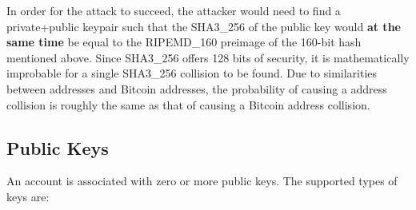 In order for the attack to succeed, the attacker would need to find a private+public keypair such that the SHA3\_256 of the public key would \textbf{at the same time} be equal to the RIPEMD\_160 preimage of the 160-bit hash mentioned above.
Since SHA3\_256 offers 128 bits of security, it is mathematically improbable for a single SHA3\_256 collision to be found.
Due to similarities between \codenamespace addresses and Bitcoin addresses, the probability of causing a \codenamespace address collision is roughly the same as that of causing a Bitcoin address collision.

\subsection{Public Keys}
\label{sec:accounts:keys}

An account is associated with zero or more public keys. The supported types of keys are:
